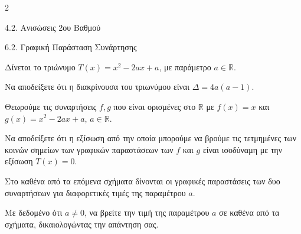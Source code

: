 \begin{ylh}{2}
    \item 4.2. Ανισώσεις 2ου Βαθμού
    \item 6.2. Γραφική Παράσταση Συνάρτησης
\end{ylh}

Δίνεται το τριώνυμο $T(x) = x^2 - 2a x + a$, με παράμετρο $a \in \mathbb{R}$.

\begin{alist}
\item Να αποδείξετε ότι η διακρίνουσα του τριωνύμου είναι $\Delta = 4a(a - 1)$.
\item Θεωρούμε τις συναρτήσεις $f, g$ που είναι ορισμένες στο $\mathbb{R}$ με $f(x) = x$ και $g(x) = x^2 - 2a x + a$, $a \in \mathbb{R}$.

\begin{rlist}
\item Να αποδείξετε ότι η εξίσωση από την οποία μπορούμε να βρούμε τις τετμημένες των κοινών σημείων των γραφικών παραστάσεων των $f$ και $g$ είναι ισοδύναμη με την εξίσωση $T(x) = 0$.
\item Στο καθένα από τα επόμενα σχήματα δίνονται οι γραφικές παραστάσεις των δυο συναρτήσεων για διαφορετικές τιμές της παραμέτρου $a$.

Με δεδομένο ότι $a \neq 0$, να βρείτε την τιμή της παραμέτρου $a$ σε καθένα από τα σχήματα, δικαιολογώντας την απάντηση σας.
\end{rlist}
\end{alist}


